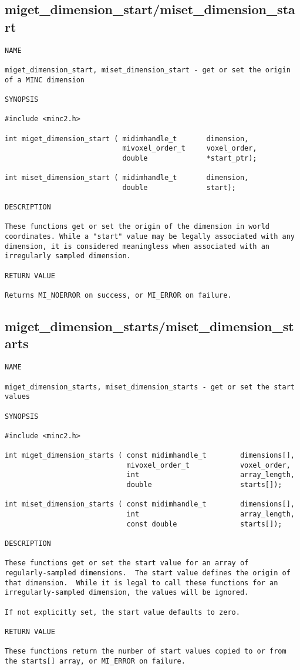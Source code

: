 \documentclass{article}
\begin{document}
\subsection{miget\_dimension\_start/miset\_dimension\_start}
\begin{verbatim}
NAME

miget_dimension_start, miset_dimension_start - get or set the origin
of a MINC dimension

SYNOPSIS

#include <minc2.h>

int miget_dimension_start ( midimhandle_t       dimension, 
                            mivoxel_order_t     voxel_order,
                            double              *start_ptr);

int miset_dimension_start ( midimhandle_t       dimension,
                            double              start);

DESCRIPTION

These functions get or set the origin of the dimension in world
coordinates. While a "start" value may be legally associated with any
dimension, it is considered meaningless when associated with an
irregularly sampled dimension.   

RETURN VALUE

Returns MI_NOERROR on success, or MI_ERROR on failure.
\end{verbatim}

\subsection{miget\_dimension\_starts/miset\_dimension\_starts}
\begin{verbatim}
NAME

miget_dimension_starts, miset_dimension_starts - get or set the start
values

SYNOPSIS

#include <minc2.h>

int miget_dimension_starts ( const midimhandle_t        dimensions[],
                             mivoxel_order_t            voxel_order,
                             int                        array_length,
                             double                     starts[]);
      
int miset_dimension_starts ( const midimhandle_t        dimensions[],
                             int                        array_length,
                             const double               starts[]);

DESCRIPTION

These functions get or set the start value for an array of
regularly-sampled dimensions.  The start value defines the origin of
that dimension.  While it is legal to call these functions for an
irregularly-sampled dimension, the values will be ignored.

If not explicitly set, the start value defaults to zero.

RETURN VALUE

These functions return the number of start values copied to or from
the starts[] array, or MI_ERROR on failure.
\end{verbatim}
\end{document}
